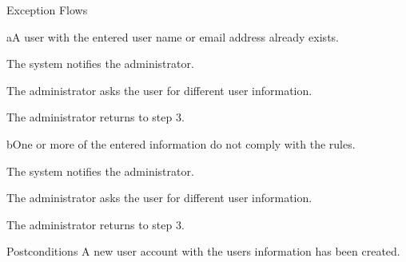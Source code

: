 %
\begin{cpartList}{Exception Flows}
  \begin{innerList}{4}{a}{A user with the entered user name or email address already exists.}
    \item The system notifies the administrator.
    \item The administrator asks the user for different user information.
    \item The administrator returns to step 3.
  \end{innerList}

  \begin{innerList}{4}{b}{One or more of the entered information do not comply with the rules.}
    \item The system notifies the administrator.
    \item The administrator asks the user for different user information.
    \item The administrator returns to step 3.
  \end{innerList}
\end{cpartList}

%
\begin{cpart}{Postconditions}
A new user account with the users information has been created.
\end{cpart}

